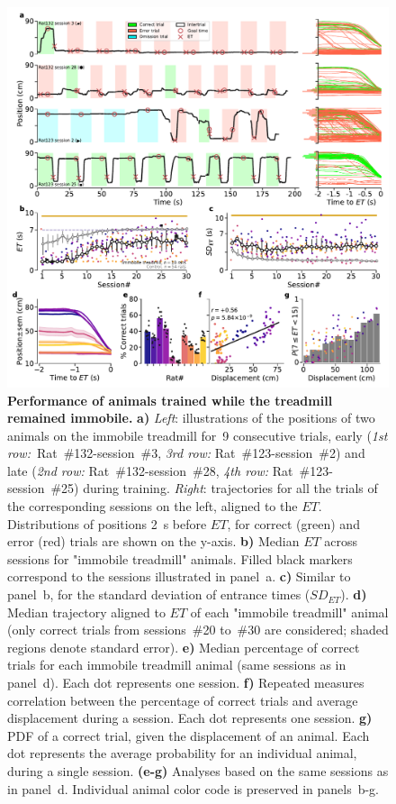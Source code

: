 \begin{figure}[!bt]
  \begin{center}
    \includegraphics[width=.8\linewidth]{ch-time/figures/ImmTrd.pdf}
    \caption[Immobile Condition]
    {\textbf{Performance of animals trained while the treadmill remained immobile.}
    \textbf{a)}
    \textit{Left}: illustrations of the positions of two animals on the immobile treadmill for~9 consecutive trials, early (\textit{1st row:}~Rat~\#132-session~\#3, \textit{3rd row:} Rat~\#123-session~\#2) and late (\textit{2nd row:} Rat~\#132-session~\#28, \textit{4th row:} Rat~\#123-session~\#25) during training.
    \textit{Right}: trajectories for all the trials of the corresponding sessions on the left, aligned to the $ET$.
    Distributions of positions 2~s before $ET$, for correct (green) and error (red) trials are shown on the y-axis.
    \textbf{b)}
    Median $ET$ across sessions for "immobile treadmill" animals.
    Filled black markers correspond to the sessions illustrated in panel~a.
    \textbf{c)}
    Similar to panel~b, for the standard deviation of entrance times ($SD_{ET}$).
    \textbf{d)}
    Median trajectory aligned to $ET$ of each "immobile treadmill" animal (only correct trials from sessions~\#20 to~\#30 are considered; shaded regions denote standard error).
    \textbf{e)}
    Median percentage of correct trials for each immobile treadmill animal (same sessions as in panel~d).
    Each dot represents one session.
    \textbf{f)}
    Repeated measures correlation between the percentage of correct trials and average displacement during a session.
    Each dot represents one session.
    \textbf{g)}
    PDF of a correct trial, given the displacement of an animal.
    Each dot represents the average probability for an individual animal, during a single session.
    \textbf{(e-g)}
    Analyses based on the same sessions as in panel~d.
    Individual animal color code is preserved in panels~b-g.
    }
    \label{fig:time:ImmTrd}
  \end{center}
\end{figure}
